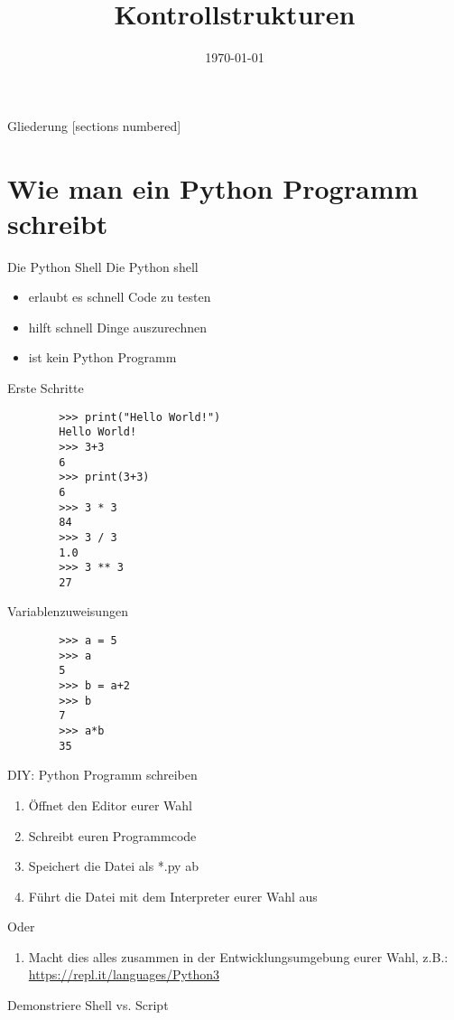 



\title{Kontrollstrukturen}
\date{\today}




\maketitle

\begin{frame}{Gliederung}
    [sections numbered]
    \tableofcontents
\end{frame}

\section{Wie man ein Python Programm schreibt}
\begin{frame}{Die Python Shell}
	Die Python shell
	\begin{itemize}
		\item erlaubt es schnell Code zu testen
		\item hilft schnell Dinge auszurechnen
		\item ist kein Python Programm
	\end{itemize}
\end{frame}



\begin{frame}[fragile]{Erste Schritte}
	\begin{lstlisting}
		>>> print("Hello World!")
		Hello World!
		>>> 3+3
		6
		>>> print(3+3)
		6
		>>> 3 * 3
		84
		>>> 3 / 3 
		1.0
		>>> 3 ** 3
		27
	\end{lstlisting}
\end{frame}

\begin{frame}[fragile]{Variablenzuweisungen}
	\begin{lstlisting}
		>>> a = 5
		>>> a
		5
		>>> b = a+2
		>>> b
		7
		>>> a*b
		35	
	\end{lstlisting}
\end{frame}

\begin{frame}{DIY: Python Programm schreiben}
	\begin{enumerate}
		\item Öffnet den Editor eurer Wahl
		\item Schreibt euren Programmcode
		\item Speichert die Datei als *.py ab
		\item Führt die Datei mit dem Interpreter eurer Wahl aus
	\end{enumerate}
	Oder
	\begin{enumerate}
		\item Macht dies alles zusammen in der Entwicklungsumgebung eurer Wahl, z.B.: \url{https://repl.it/languages/Python3}
	\end{enumerate}
	\pause Demonstriere Shell vs. Script
\end{frame}

